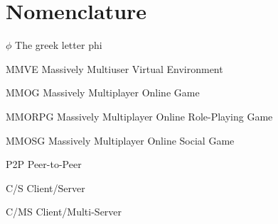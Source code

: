 \chapter{Nomenclature}

\newlength{\gnat}

\begin{Nomencl}[\gnat]

		\item[$\phi$]		The greek letter phi
		
		\item[MMVE]			Massively Multiuser Virtual Environment
        \item[MMOG]			Massively Multiplayer Online Game
        \item[MMORPG]       Massively Multiplayer Online Role-Playing Game
        \item[MMOSG]       Massively Multiplayer Online Social Game
        \item[P2P]       Peer-to-Peer
        \item[C/S]       Client/Server
        \item[C/MS]       Client/Multi-Server
\end{Nomencl}
\endinput
